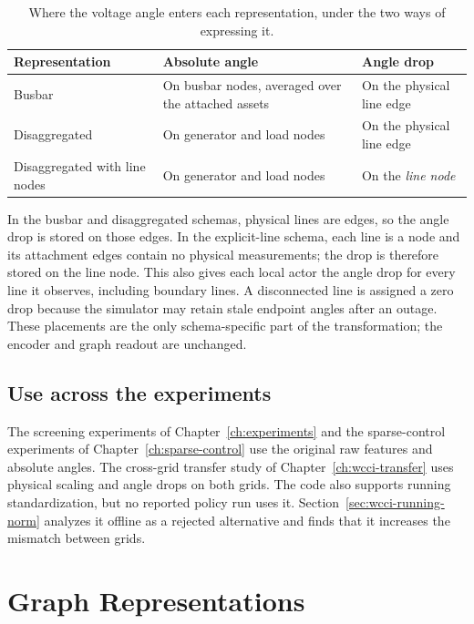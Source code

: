 \begin{table}[H]
  \centering
  \small
  \caption{Where the voltage angle enters each representation, under the two
  ways of expressing it.}
  \label{tab:angle-placement}
  \setlength{\tabcolsep}{4pt}
  \begin{tabular}{L{0.26\textwidth}L{0.30\textwidth}L{0.34\textwidth}}
    \toprule
    Representation & Absolute angle & Angle drop \\
    \midrule
    Busbar & On busbar nodes, averaged over the attached assets &
    On the physical line edge \\
    Disaggregated & On generator and load nodes &
    On the physical line edge \\
    Disaggregated with line nodes & On generator and load nodes &
    On the \emph{line node} \\
    \bottomrule
  \end{tabular}
\end{table}

\noindent In the busbar and disaggregated schemas, physical lines are edges, so the angle
drop is stored on those edges. In the explicit-line schema, each line is a node
and its attachment edges contain no physical measurements; the drop is
therefore stored on the line node. This also gives each local actor the angle
drop for every line it observes, including boundary lines. A disconnected line
is assigned a zero drop because the simulator may retain stale endpoint angles
after an outage. These placements are the only schema-specific part of the
transformation; the encoder and graph readout are unchanged.

\subsection{Use across the experiments}

The screening experiments of Chapter~\ref{ch:experiments} and the sparse-control
experiments of Chapter~\ref{ch:sparse-control} use the original raw features and
absolute angles. The cross-grid transfer study of
Chapter~\ref{ch:wcci-transfer} uses physical scaling and angle drops on both
grids. The code also supports running standardization, but no reported policy
run uses it. Section~\ref{sec:wcci-running-norm} analyzes it offline as a
rejected alternative and finds that it increases the mismatch between grids.


\section{Graph Representations}
\label{sec:graph-representation}

